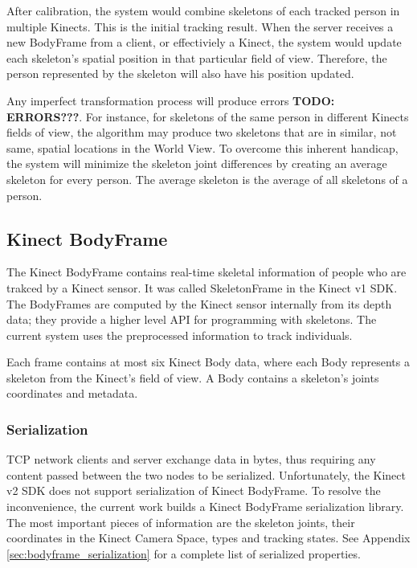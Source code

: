 \documentclass{sigchi}
\begin{document}
After calibration, the system would combine skeletons of each tracked person in multiple Kinects. This is the initial tracking result. When the server receives a new BodyFrame from a client, or effectiviely a Kinect, the system would update each skeleton's spatial position in that particular field of view. Therefore, the person represented by the skeleton will also have his position updated.

Any imperfect transformation process will produce errors \textbf{TODO: ERRORS???}. For instance, for skeletons of the same person in different Kinects fields of view, the algorithm may produce two skeletons that are in similar, not same, spatial locations in the World View. To overcome this inherent handicap, the system will minimize the skeleton joint differences by creating an average skeleton for every person. The average skeleton is the average of all skeletons of a person.

\subsection{Kinect BodyFrame}

The Kinect BodyFrame contains real-time skeletal information of people who are trakced by a Kinect sensor. It was called SkeletonFrame in the Kinect v1 SDK. The BodyFrames are computed by the Kinect sensor internally from its depth data; they provide a higher level API for programming with skeletons. The current system uses the preprocessed information to track individuals.

Each frame contains at most six Kinect Body data, where each Body represents a skeleton from the Kinect's field of view. A Body contains a skeleton's joints coordinates and metadata.

\subsubsection{Serialization}

TCP network clients and server exchange data in bytes, thus requiring any content passed between the two nodes to be serialized. Unfortunately, the Kinect v2 SDK does not support serialization of Kinect BodyFrame. To resolve the inconvenience, the current work builds a Kinect BodyFrame serialization library. The most important pieces of information are the skeleton joints, their coordinates in the Kinect Camera Space, types and tracking states. See Appendix \ref{sec:bodyframe_serialization} for a complete list of serialized properties.
\end{document}
